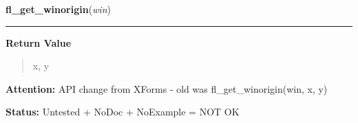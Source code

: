     \label{xformslib:library:fl_get_winorigin}

    \vspace{0.5ex}

\hspace{.8\funcindent}\begin{boxedminipage}{\funcwidth}

    \raggedright \textbf{fl\_get\_winorigin}(\textit{win})

    \vspace{-1.5ex}

    \rule{\textwidth}{0.5\fboxrule}
\setlength{\parskip}{2ex}
\setlength{\parskip}{1ex}
      \textbf{Return Value}
    \vspace{-1ex}

      \begin{quote}
      x, y

      \end{quote}

\textbf{Attention:} API change from XForms - old was fl\_get\_winorigin(win, x, y)



\textbf{Status:} Untested + NoDoc + NoExample = NOT OK



    \end{boxedminipage}

    \label{xformslib:library:fl_get_wingeometry}

    \vspace{0.5ex}

